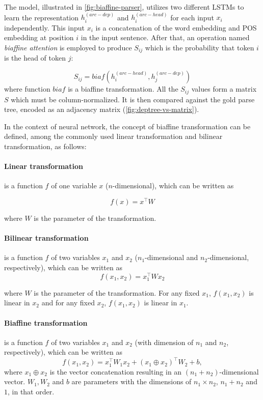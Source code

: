 The model, illustrated in \cref{fig:biaffine-parser}, utilizes two different LSTMs to learn the representation $h^{(arc-dep)}_i$ and $h^{(arc-head)}_i$ for each input $x_i$ independently. This input $x_i$ is a concatenation of the word embedding and POS embedding at position $i$ in the input sentence.
After that, an operation named \textit{biaffine attention} is employed to produce $S_{ij}$ which is the probability that token $i$ is the head of token $j$:

\[ S_{ij} = biaf(h^{(arc-head)}_i, h^{(arc-dep)}_j) \] where function $biaf$ is a biaffine transformation. All the $S_{ij}$ values form a matrix $S$ which must be column-normalized.
It is then compared against the gold parse tree, encoded as an adjacency matrix (\cref{fig:deptree-vs-matrix}).

In the context of neural network, the concept of biaffine transformation can be defined, among the commonly used linear transformation and bilinear transformation, as follows:

\paragraph{Linear transformation} is a function $f$ of one variable $x$ ($n$-dimensional), which can be written as 

$$f(x)=x^\intercal W$$

where $W$ is the parameter of the transformation.

\paragraph{Bilinear transformation} is a function $f$ of two variables $x_1$ and $x_2$ ($n_1$-dimensional and $n_2$-dimensional, respectively), which can be written as $$f(x_1, x_2)=x_1^\intercal W x_2$$

where $W$ is the parameter of the transformation. For any fixed $x_1$, $f(x_1, x_2)$ is linear in $x_2$ and for any fixed $x_2$, $f(x_1, x_2)$ is linear in $x_1$.

\paragraph{Biaffine transformation} is a function $f$ of two variables $x_1$ and $x_2$ (with dimension of $n_1$ and $n_2$, respectively), which can be written as $$f(x_1, x_2) = x_1^\intercal W_1 x_2 + (x_1\oplus x_2)^\intercal W_2 + b,$$ where $x_1 \oplus x_2 $ is the vector concatenation resulting in an $(n_1+n_2)$-dimensional vector. $W_1, W_2$ and $b$ are parameters with the dimensions of $n_1\times n_2$, $n_1+n_2$ and $1$, in that order.

